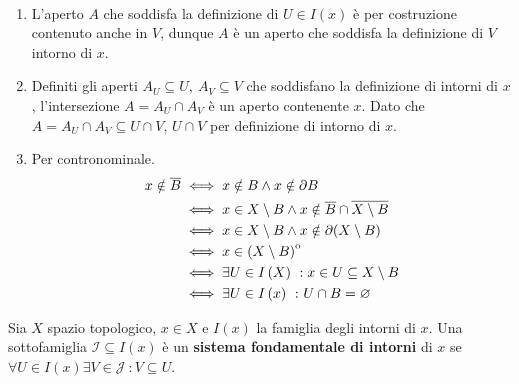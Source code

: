 \begin{demonstration}~{}
\begin{enumerate}[label=\Roman*]
\item L'aperto $A$ che soddisfa la definizione di $U\in I\left(x\right)$ è per costruzione contenuto anche in $V$, dunque $A$ è un aperto che soddisfa la definizione di $V$ intorno di $x$.
\item Definiti gli aperti $A_U\subseteq U,\ A_V\subseteq V$ che soddisfano la definizione di intorni di $x$, l'intersezione $A=A_U\cap A_V$ è un aperto contenente $x$. Dato che $A=A_U\cap A_V\subseteq U\cap V$, $U\cap V$ per definizione di intorno di $x$.
\item Per contronominale. \begin{align*}
	x\notin \overline{B} &\iff x\notin B \wedge x\notin \partial B\\
	&\iff x\in X\setminus B \wedge x\notin \overline{B}\cap\overline{X\setminus B}\\
	& \iff x\in X\setminus B \wedge x\notin \partial (X\setminus B)\\
	& \iff x\in \interior{\left(X\setminus B\right)}\\
	& \iff \exists U\in I\left(X\right)\ : x\in U\subseteq X\setminus B\\
	&\iff \exists U\in I\left(x\right)\ \colon U\cap B=\emptyset%
\end{align*} 
\end{enumerate}
\end{demonstration}
\begin{define}
Sia $X$ spazio topologico, $x\in X$ e $I\left(x\right)$ la famiglia degli intorni di $x$. Una sottofamiglia $\mathcal{I}\subseteq I\left(x\right)$ è un \textbf{sistema fondamentale di intorni} di $x$ se $\forall U\in I\left(x\right)\exists V\in\mathcal{J}\ \colon V\subseteq U$.
\end{define}
